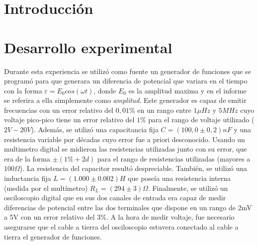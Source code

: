\documentclass[11pt,a4paper]{article}
\begin{document}
\section{Introducción}\label{sec:intro}




\section{Desarrollo experimental}

Durante esta experiencia se utilizó como fuente un generador de funciones que se programó para que generara un diferencia de potencial que variara en el tiempo con la forma $\varepsilon = E_{0}cos(\omega t)$, donde $E_{0}$ es la amplitud maxima y en el informe se referira a ella simplemente como \textit{amplitud}. Este generador es capaz de emitir frecuencias con un error relativo del $0,01\%$ en un rango entre $1\mu Hz$ y $5MHz$ cuyo voltaje pico-pico tiene un error relativo del $1\%$ para el rango de voltaje utilizado ($2V-20V$). Además, se utilizó una capacitancia fija $C = (100,0 \pm 0,2)nF$ y una resistencia variable por décadas cuyo error fue a priori desconocido. Usando un multimetro digital se midieron las resistencias utilizadas junto con su error, que era de la forma $\pm(1\%+2d)$ para el rango de resistencias utilizadas (mayores a $100\Omega$). La resistencia del capacitor resultó despreciable. También, se utilizó una inductancia fija $L = (1.000 \pm 0.002) H$ que poseía una resistencia interna (medida por el multímetro) $R_L = (294 \pm 3) \Omega$.
Finalmente, se utilizó un osciloscopio digital que en sus dos canales de entrada era capaz de medir diferencias de potencial entre las dos terminales que dispone en un rango de 2mV a 5V con un error relativo del $3\%$. A la hora de medir voltaje, fue necesario asegurarse que el cable a tierra del osciloscopio estuvera conectado al cable a tierra el generador de funciones. 
\end{document}
